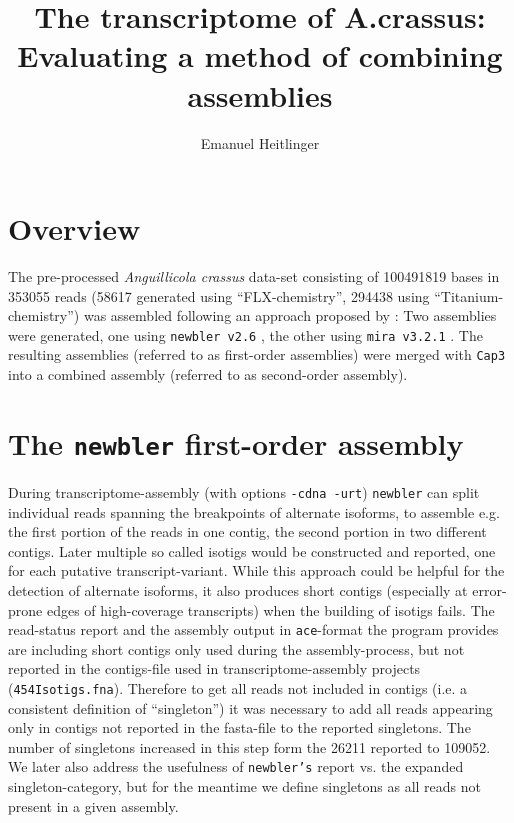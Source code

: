 \documentclass[12pt,a4paper]{article}
\date{}
\begin{document}
\title{The transcriptome of A.crassus: Evaluating a method of combining assemblies}
\author{Emanuel Heitlinger}

\maketitle




\section{Overview}
\label{sec:overview}

The pre-processed \textit{Anguillicola crassus} data-set consisting of
100491819 bases in 353055 reads (58617
generated using ``FLX-chemistry'', 294438 using
``Titanium-chemistry'') was assembled following an approach proposed
by \cite{pmid20950480}: Two assemblies were generated, one using
\texttt{newbler v2.6} \cite{pmid16056220}, the other using
\texttt{mira v3.2.1} \cite{miraEST}. The resulting assemblies
(referred to as first-order assemblies) were merged with \texttt{Cap3}
\cite{Cap3_Huang} into a combined assembly (referred to as
second-order assembly).


\section{The \texttt{newbler} first-order assembly}
\label{sec:new-fist}




During transcriptome-assembly (with options \texttt{-cdna -urt})
\texttt{newbler} can split individual reads spanning the breakpoints
of alternate isoforms, to assemble e.g. the first portion of the reads
in one contig, the second portion in two different contigs. Later
multiple so called isotigs would be constructed and reported, one for
each putative transcript-variant. While this approach could be helpful
for the detection of alternate isoforms, it also produces short
contigs (especially at error-prone edges of high-coverage transcripts)
when the building of isotigs fails. The read-status report and the
assembly output in \texttt{ace}-format the program provides are
including short contigs only used during the assembly-process, but not
reported in the contigs-file used in transcriptome-assembly projects
(\texttt{454Isotigs.fna}). Therefore to get all reads not included in
contigs (i.e. a consistent definition of ``singleton'') it was
necessary to add all reads appearing only in contigs not reported in
the fasta-file to the reported singletons. The number of singletons
increased in this step form the 26211
reported to 109052. We later also address the
usefulness of \texttt{newbler's} report vs. the expanded
singleton-category, but for the meantime we define singletons as all
reads not present in a given assembly.
\end{document}

